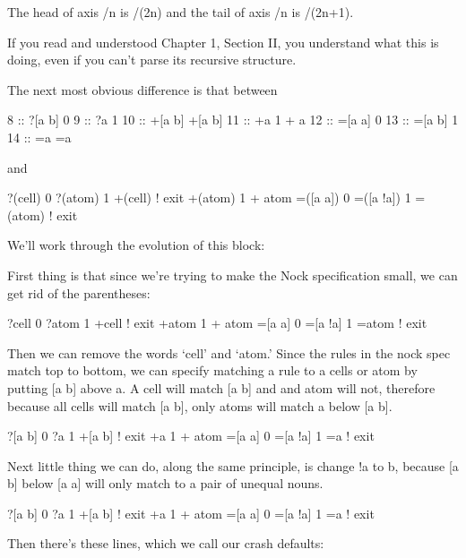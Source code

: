 The head of axis /n is /(2n) and the tail of axis /n is /(2n+1). 

If you read and understood Chapter 1, Section II, you understand what this is doing, even if you can't parse its recursive structure.

The next most obvious difference is that between

\begin{code}
8  ::    ?[a b]           0
9  ::    ?a               1
10 ::    +[a b]           +[a b]
11 ::    +a               1 + a
12 ::    =[a a]           0
13 ::    =[a b]           1
14 ::    =a               =a
\end{code}
and 

\begin{code}
?(cell)               0
?(atom)               1
+(cell)               ! exit
+(atom)               1 + atom
=([a a])              0 
=([a !a])             1
=(atom)               ! exit
\end{code}
We'll work through the evolution of this block:

First thing is that since we're trying to make the Nock specification small, we can get rid of the parentheses:

\begin{code}
?cell               0
?atom               1
+cell               ! exit
+atom               1 + atom
=[a a]              0 
=[a !a]             1
=atom               ! exit

\end{code}
Then we can remove the words `cell' and `atom.' Since the rules in the nock spec match top to bottom, we can specify matching a rule to a cells or atom by putting [a b] above a. A cell will match [a b] and and atom will not, therefore because all cells will match [a b],
only atoms will match a below [a b].

\begin{code}
?[a b]             0
?a                 1
+[a b]             ! exit
+a                 1 + atom
=[a a]             0 
=[a !a]            1
=a                 ! exit

\end{code}

Next little thing we can do, along the same principle, is change !a to b, because [a b] below [a a] will only match to a pair of unequal nouns.

\begin{code}
?[a b]             0
?a                 1
+[a b]             ! exit
+a                 1 + atom
=[a a]             0 
=[a !a]            1
=a                 ! exit
\end{code}
Then there's these lines, which we call our crash defaults:

